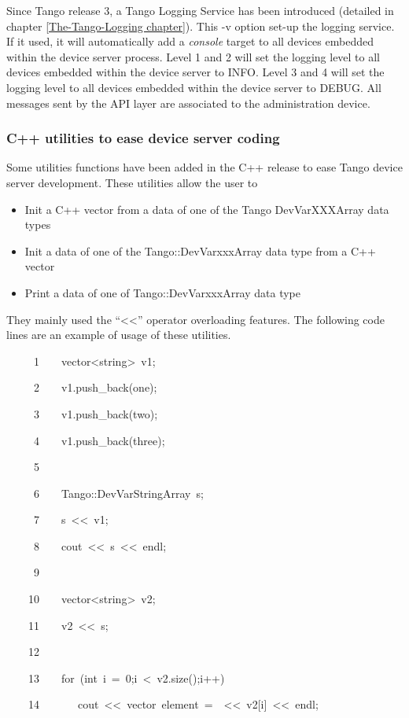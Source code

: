 Since Tango release 3, a Tango Logging Service has been introduced
(detailed in chapter \ref{The-Tango-Logging chapter}). This -v option
set-up the logging service. If it used, it will automatically add
a \emph{console} target to all devices embedded within the device
server process. Level 1 and 2 will set the logging level to all devices
embedded within the device server to INFO. Level 3 and 4 will set
the logging level to all devices embedded within the
device server to DEBUG. All messages sent by the API layer are associated
to the administration device.


\subsubsection{C++ utilities to ease device server coding}

Some utilities functions have been added in the C++ release to ease
Tango device server development. These utilities allow the user to
\begin{itemize}
\item Init a C++ vector from a data of one of the Tango DevVarXXXArray data
types 
\item Init a data of one of the Tango::DevVarxxxArray data type from a C++
vector
\item Print a data of one of Tango::DevVarxxxArray data type
\end{itemize}
They mainly used the ``<\textcompwordmark{}<''
operator overloading features. The following code lines are an example
of usage of these utilities.


\begin{lyxcode}
~~~~~1~~~~vector<string>~v1;

~~~~~2~~~~v1.push\_back(\textquotedbl{}one\textquotedbl{});

~~~~~3~~~~v1.push\_back(\textquotedbl{}two\textquotedbl{});

~~~~~4~~~~v1.push\_back(\textquotedbl{}three\textquotedbl{});

~~~~~5~~~~~~~~~~

~~~~~6~~~~Tango::DevVarStringArray~s;

~~~~~7~~~~s~<\textcompwordmark{}<~v1;

~~~~~8~~~~cout~<\textcompwordmark{}<~s~<\textcompwordmark{}<~endl;

~~~~~9~~

~~~~10~~~~vector<string>~v2;

~~~~11~~~~v2~<\textcompwordmark{}<~s;

~~~~12~~~~~~~~~~

~~~~13~~~~for~(int~i~=~0;i~<~v2.size();i++)

~~~~14~~~~~~~cout~<\textcompwordmark{}<~\textquotedbl{}vector~element~=~\textquotedbl{}~<\textcompwordmark{}<~v2{[}i{]}~<\textcompwordmark{}<~endl;
\end{lyxcode}


